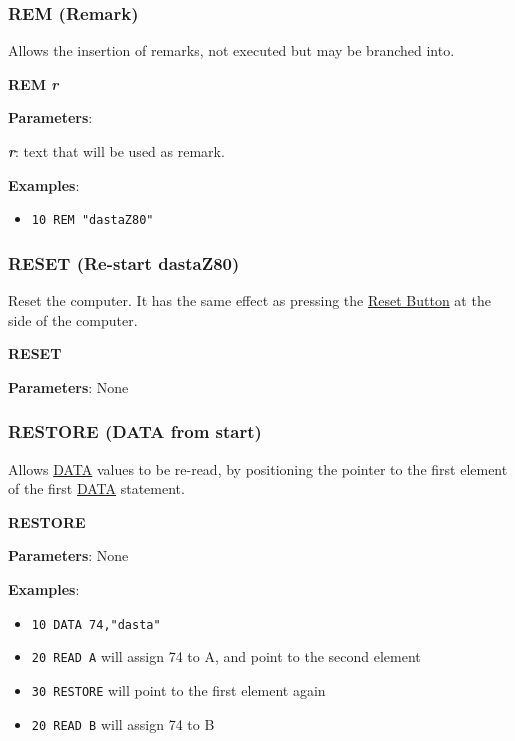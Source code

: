     \subsubsection{{REM (Remark)}}
    \label{msbasic:lang:rem}
    Allows the insertion of remarks, not executed but may be branched into.

    \hspace{1.9cm}\textbf{REM \textit{r}}

    \textbf{Parameters}:

    \hspace{1cm}\textbf{\textit{r}}: text that will be used as remark.

    \textbf{Examples}:
    \begin{itemize}
        \item \texttt{10 REM "dastaZ80"}
    \end{itemize}

    \subsubsection{{RESET (Re-start dastaZ80)}}
    \label{msbasic:lang:reset}
    Reset the computer. It has the same effect as pressing the
    \hyperref[subsec:resetbutton]{Reset Button} at the side of the computer.

    \hspace{1.9cm}\textbf{RESET}

    \textbf{Parameters}: None

    \subsubsection{{RESTORE (DATA from start)}}
    \label{msbasic:lang:restore}
    Allows \hyperref[msbasic:lang:data]{DATA} values to be re-read, by
    positioning the pointer to the first element of the first
    \hyperref[msbasic:lang:data]{DATA} statement.

    \hspace{1.9cm}\textbf{RESTORE}

    \textbf{Parameters}: None

    \textbf{Examples}:
    \begin{itemize}
        \item \texttt{10 DATA 74,"dasta"}
        \item \texttt{20 READ A} will assign 74 to A, and point to the second
        element
        \item \texttt{30 RESTORE} will point to the first element again
        \item \texttt{20 READ B} will assign 74 to B
    \end{itemize}

